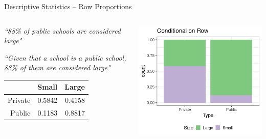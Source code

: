 \documentclass{beamer}
\begin{document}
\begin{frame}{Descriptive Statistics -- Row Proportions}

\begin{columns}

  \begin{column}{0.45\textwidth}

{\small

\textit{``88\% of public schools are considered large"} \vspace{2mm}

\textit{``Given that a school is a public school, 88\% of them are considered large"} \vspace{2mm}
}  
  
\begin{table}[ht]
\centering
\begin{tabular}{rrr}
  \hline
 & Small & Large \\ 
  \hline
Private & 0.5842 & 0.4158 \\ 
  Public & 0.1183 & 0.8817 \\ 
   \hline
\end{tabular}
\end{table}
  \end{column}
  \begin{column}{0.45\textwidth}
\begin{center}
\includegraphics[scale=0.35]{bivariate_row.png}
\end{center}
  \end{column}

\end{columns}

\end{frame}
\end{document}
